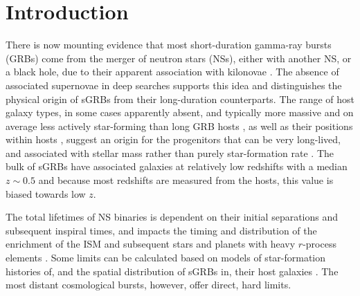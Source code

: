 \documentclass{aa}    %
\begin{document}
\section{Introduction}


There is now mounting evidence that most short-duration gamma-ray bursts (GRBs)
come from the merger of neutron stars (NSs), either with another NS, or a black
hole, due to their apparent association with kilonovae \citep{Barnes2013a,
	Tanvir2013b, Yang2015, Jin2016, Rosswog2016}. The absence of associated
supernovae in deep searches \citep[e.g.][]{Hjorth2005a,Fox2005,Hjorth2005b}
supports this idea and distinguishes the physical origin of sGRBs from their
long-duration counterparts. %
The range of host galaxy types, in some cases apparently absent, and typically
more massive and on average less actively star-forming than long GRB hosts 
\citep{Fong2013b}, as well as their positions within hosts \citep{Fong2013a},
suggest an origin for the progenitors that can be very long-lived, and
associated with stellar mass rather than purely star-formation rate
\citep{Berger2014}. The bulk of sGRBs have associated galaxies at relatively low
redshifts with a median $z\sim0.5$ \citep{Berger2014} and because most redshifts
are measured from the hosts, this value is biased towards low $z$.



The total lifetimes of NS binaries is dependent on their initial separations and
subsequent inspiral times, and impacts the timing and distribution of the
enrichment of the ISM and subsequent stars and planets with heavy $r$-process
elements \citep{VandeVoort2015, Wallner2015,  Ji2016}. Some limits can be
calculated based on models of star-formation histories of, and the spatial
distribution of sGRBs in, their host galaxies \citep[][]{Berger2014}. The most
distant cosmological bursts, however, offer direct, hard limits.
\end{document}
